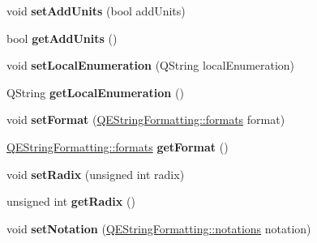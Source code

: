 \begin{DoxyCompactItemize}
\item 
\hypertarget{classQEStringFormattingMethods_afb2688304602777055777bc8d4de1b8d}{
void {\bfseries setAddUnits} (bool addUnits)}
\label{classQEStringFormattingMethods_afb2688304602777055777bc8d4de1b8d}

\item 
\hypertarget{classQEStringFormattingMethods_a14d9da0b1f92b23551e5c104b2a92605}{
bool {\bfseries getAddUnits} ()}
\label{classQEStringFormattingMethods_a14d9da0b1f92b23551e5c104b2a92605}

\item 
\hypertarget{classQEStringFormattingMethods_a3a5a542aeae747ff8e039eb6327d7eee}{
void {\bfseries setLocalEnumeration} (QString localEnumeration)}
\label{classQEStringFormattingMethods_a3a5a542aeae747ff8e039eb6327d7eee}

\item 
\hypertarget{classQEStringFormattingMethods_aeb35cbe43f4286d1658a7ffaa72b8d4f}{
QString {\bfseries getLocalEnumeration} ()}
\label{classQEStringFormattingMethods_aeb35cbe43f4286d1658a7ffaa72b8d4f}

\item 
\hypertarget{classQEStringFormattingMethods_a7e09ac1845b4839054bf4371efbe60db}{
void {\bfseries setFormat} (\hyperlink{classQEStringFormatting_a41b4737442692b41d12b78c036cf9e56}{QEStringFormatting::formats} format)}
\label{classQEStringFormattingMethods_a7e09ac1845b4839054bf4371efbe60db}

\item 
\hypertarget{classQEStringFormattingMethods_a81405d25950732f09120e6ad2675d63b}{
\hyperlink{classQEStringFormatting_a41b4737442692b41d12b78c036cf9e56}{QEStringFormatting::formats} {\bfseries getFormat} ()}
\label{classQEStringFormattingMethods_a81405d25950732f09120e6ad2675d63b}

\item 
\hypertarget{classQEStringFormattingMethods_a680d7d01898457930b3d888595e72562}{
void {\bfseries setRadix} (unsigned int radix)}
\label{classQEStringFormattingMethods_a680d7d01898457930b3d888595e72562}

\item 
\hypertarget{classQEStringFormattingMethods_ae8a21540576fc9c8ae4dcc6377544706}{
unsigned int {\bfseries getRadix} ()}
\label{classQEStringFormattingMethods_ae8a21540576fc9c8ae4dcc6377544706}

\item 
\hypertarget{classQEStringFormattingMethods_a1211a8bd2de6ef85c93a524f815df51f}{
void {\bfseries setNotation} (\hyperlink{classQEStringFormatting_adfa7fa261e196d1327d4da6e046dbd84}{QEStringFormatting::notations} notation)}
\label{classQEStringFormattingMethods_a1211a8bd2de6ef85c93a524f815df51f}


\end{DoxyCompactItemize}
